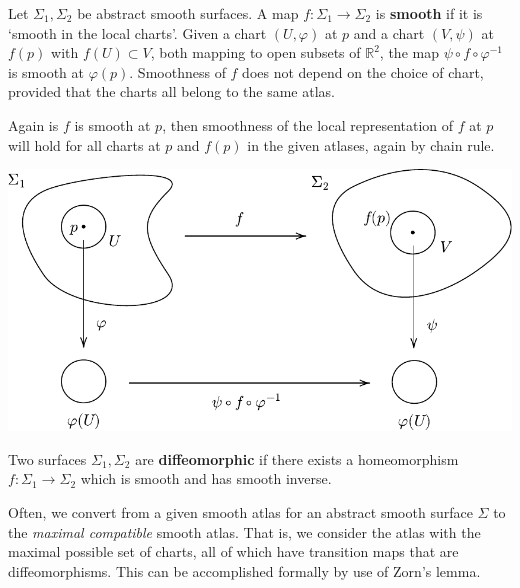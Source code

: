 \documentclass[a4paper]{article}
\begin{document}
\begin{definition}
	Let \( \Sigma_1, \Sigma_2 \) be abstract smooth surfaces.
	A map \( f \colon \Sigma_1 \to \Sigma_2 \) is \textbf{smooth} if it is `smooth in the local charts'.
	Given a chart \( (U, \varphi) \) at \( p \) and a chart \( (V, \psi) \) at \( f(p) \) with $ f(U) \subset V $, both mapping to open subsets of \( \mathbb R^2 \), the map \( \psi \circ f \circ \varphi^{-1} \) is smooth at \( \varphi(p) \).
	Smoothness of \( f \) does not depend on the choice of chart, provided that the charts all belong to the same atlas.
\end{definition}
Again is $f$ is smooth at $p$, then smoothness of the local representation of $f$ at $p$ will hold for all charts at $p$ and $f(p)$ in the given atlases, again by chain rule.
\begin{center}
\includegraphics[scale=0.8]{SmoothFunction2}
\end{center}
\begin{definition}
	Two surfaces \( \Sigma_1, \Sigma_2 \) are \textbf{diffeomorphic} if there exists a homeomorphism \( f \colon \Sigma_1 \to \Sigma_2 \) which is smooth and has smooth inverse.
\end{definition}
\begin{remark}
	Often, we convert from a given smooth atlas for an abstract smooth surface \( \Sigma \) to the \textit{maximal compatible} smooth atlas.
	That is, we consider the atlas with the maximal possible set of charts, all of which have transition maps that are diffeomorphisms.
	This can be accomplished formally by use of Zorn's lemma.
\end{remark}
\end{document}
